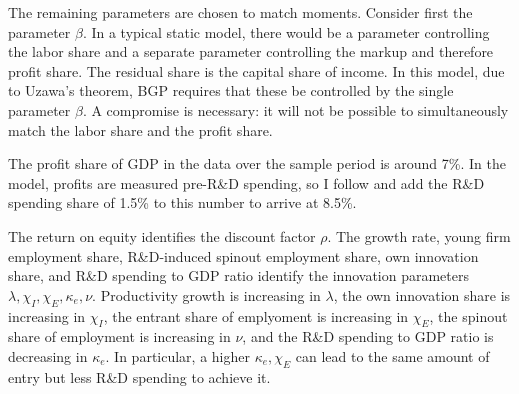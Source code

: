 \documentclass[11pt,english]{article}
\theoremstyle{remark}
\begin{document}
The remaining parameters are chosen to match moments. Consider first the parameter $\beta$. In a typical static model, there would be a parameter controlling the labor share and a separate parameter controlling the markup and therefore profit share. The residual share is the capital share of income. In this model, due to Uzawa's theorem, BGP requires that these be controlled by the single parameter $\beta$. A compromise is necessary: it will not be possible to simultaneously match the labor share and the profit share. 

The profit share of GDP in the data over the sample period is around 7\%. In the model, profits are measured pre-R\&D spending, so I follow \cite{akcigit_growth_2018} and add the R\&D spending share of 1.5\% to this number to arrive at 8.5\%. 

The return on equity identifies the discount factor $\rho$. The growth rate, young firm employment share, R\&D-induced spinout employment share, own innovation share, and R\&D spending to GDP ratio identify the innovation parameters $\lambda, \chi_I, \chi_E, \kappa_e, \nu$. Productivity growth is increasing in $\lambda$, the own innovation share is increasing in $\chi_I$, the entrant share of emplyoment is increasing in $\chi_E$, the spinout share of employment is increasing in $\nu$, and the R\&D spending to GDP ratio is decreasing in $\kappa_e$. In particular, a higher $\kappa_e, \chi_E$ can lead to the same amount of entry but less R\&D spending to achieve it.
\end{document}
